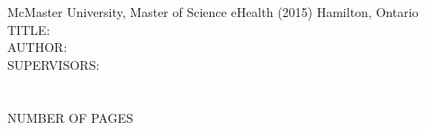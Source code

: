 \begin{titlepage}
 \begin{flushleft}
    McMaster University, Master of Science eHealth (2015) Hamilton, Ontario \\
        \vspace{0.8in}
    TITLE: \thesistitle \\
        \vspace{0.4in}
    AUTHOR: \authorname \\
    \vspace{0.4in}
    SUPERVISORS: \\
    \committeechair\\
    \othercommitteemembers\\
    \vspace{0.4in}
    NUMBER OF PAGES \pageref{LastPage} \\
\end{flushleft}
\end{titlepage}